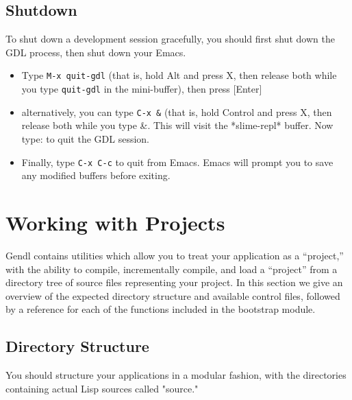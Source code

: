 \documentclass [11pt]{book}
\begin{document}
\subsection{Shutdown}

\label{subsec:shutdown}

 To shut down a development session gracefully, you should first shut down the GDL process,
then shut down your Emacs.

\begin{itemize}

\item Type \texttt{M-x quit-gdl} (that is, hold Alt and press X, then release both while you type \texttt{quit-gdl} in the mini-buffer), then press [Enter]

\item alternatively, you can type \texttt{C-x &} (that is, hold Control and press X, then release both while you type &. 
This will visit the *slime-repl* buffer. Now type: 
 to quit the GDL session.

\item Finally, type \texttt{C-x C-c} to quit from Emacs. Emacs will prompt you to save any
	   modified buffers before exiting.

\end{itemize}



\section{Working with Projects}

\label{sec:workingwithprojects}

Gendl contains utilities which allow you to treat your
application as a ``project,'' with the ability to compile,
incrementally compile, and load a ``project'' from a directory tree of
source files representing your project. In this section we give an
overview of the expected directory structure and available control
files, followed by a reference for each of the functions included in
the bootstrap module.

\subsection{Directory Structure}

\label{subsec:directorystructure}



You should structure your applications in a modular fashion, with the
directories containing actual Lisp sources called "source."
\end{document}
